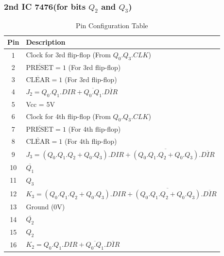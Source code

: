 \documentclass[a4paper,12pt]{article}
\begin{document}
\subsubsection{2nd IC 7476(for bits $Q_2$ and $Q_3$)}
\begin{table}[H]
    \centering
    \renewcommand{\arraystretch}{1.3} %
    \begin{tabular}{|c|l|}
        \hline
        \textbf{Pin} & \textbf{Description} \\ 
        \hline
        1  & Clock for 3rd flip-flop (From $Q_0.Q_3.CLK$)\\ 
        2  & $\overline{\text{PRESET}} = 1$ (For 3rd flip-flop) \\ 
        3  & $\overline{\text{CLEAR}} = 1$ (For 3rd flip-flop) \\ 
        4  & $J_2 = Q_0.Q_1.DIR+\overline{Q_0.Q_1}.\overline{DIR}$ \\ 
        5  & Vcc = 5V \\ 
        6  & Clock for 4th flip-flop (From $Q_0.Q_3.CLK$)\\ 
        7  & $\overline{\text{PRESET}} = 1$ (For 4th flip-flop) \\ 
        8  & $\overline{\text{CLEAR}} = 1$ (For 4th flip-flop) \\ 
        9  & $J_3 = (Q_0.Q_1.Q_2+Q_0.Q_3).DIR+\overline{(Q_0.Q_1.Q_2+Q_0.Q_3)}.\overline{DIR}$ \\ 
        10 & $\overline{Q_1}$ \\ 
        11 & $Q_3$ \\ 
        12 & $K_3 = (Q_0.Q_1.Q_2+Q_0.Q_3).DIR+\overline{(Q_0.Q_1.Q_2+Q_0.Q_3)}.\overline{DIR}$ \\ 
        13 & Ground (0V) \\ 
        14 & $\overline{Q_2}$ \\ 
        15 & $Q_2$ \\ 
        16 & $K_2 = Q_0.Q_1.DIR+\overline{Q_0.Q_1}.\overline{DIR}$ \\ 
        \hline
    \end{tabular}
    \caption{Pin Configuration Table}
    \label{tab:pin_config}
\end{table}
 
\end{document}
